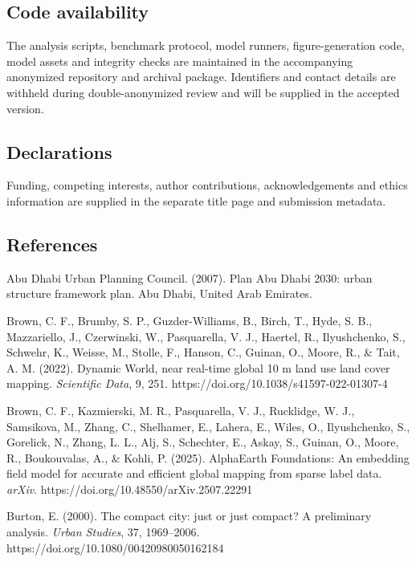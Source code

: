 \documentclass[
]{article}
\begin{document}
\subsection{Code availability}\label{code-availability}

The analysis scripts, benchmark protocol, model runners,
figure-generation code, model assets and integrity checks are maintained
in the accompanying anonymized repository and archival package.
Identifiers and contact details are withheld during double-anonymized
review and will be supplied in the accepted version.

\subsection{Declarations}\label{declarations}

Funding, competing interests, author contributions, acknowledgements and
ethics information are supplied in the separate title page and
submission metadata.

\subsection{References}\label{references}

Abu Dhabi Urban Planning Council. (2007). Plan Abu Dhabi 2030: urban
structure framework plan. Abu Dhabi, United Arab Emirates.

Brown, C. F., Brumby, S. P., Guzder-Williams, B., Birch, T., Hyde, S.
B., Mazzariello, J., Czerwinski, W., Pasquarella, V. J., Haertel, R.,
Ilyushchenko, S., Schwehr, K., Weisse, M., Stolle, F., Hanson, C.,
Guinan, O., Moore, R., \& Tait, A. M. (2022). Dynamic World, near
real-time global 10 m land use land cover mapping. \emph{Scientific
Data}, 9, 251. https://doi.org/10.1038/s41597-022-01307-4

Brown, C. F., Kazmierski, M. R., Pasquarella, V. J., Rucklidge, W. J.,
Samsikova, M., Zhang, C., Shelhamer, E., Lahera, E., Wiles, O.,
Ilyushchenko, S., Gorelick, N., Zhang, L. L., Alj, S., Schechter, E.,
Askay, S., Guinan, O., Moore, R., Boukouvalas, A., \& Kohli, P. (2025).
AlphaEarth Foundations: An embedding field model for accurate and
efficient global mapping from sparse label data. \emph{arXiv}.
https://doi.org/10.48550/arXiv.2507.22291

Burton, E. (2000). The compact city: just or just compact? A preliminary
analysis. \emph{Urban Studies}, 37, 1969--2006.
https://doi.org/10.1080/00420980050162184
\end{document}
